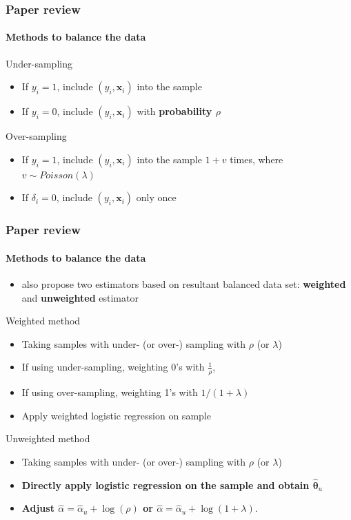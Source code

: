 \documentclass{beamer}
\newcommand{\red}{\color{red}}
\newcommand{\blue}{\color{blue}}
\newcommand{\htheta}{\hat{\bm{\theta}}}
\newcommand{\x}{\bm{x}}
\newcommand{\rhl}[1]{{\red \textbf{#1}}}
\newcommand{\bhl}[1]{{\blue \textbf{#1}}}
\begin{document}
    \begin{frame}
        \frametitle{Paper review}
        \framesubtitle{Methods to balance the data}
        \begin{exampleblock}{Under-sampling}
        \begin{itemize}
            \item If $y_i=1$, include $(y_i, \x_i)$ into the sample
            \item If $y_i=0$, include $(y_i, \x_i)$ with \bhl{probability $\rho$}
        \end{itemize}
    \end{exampleblock}
    \begin{exampleblock}{Over-sampling}
        \begin{itemize}
            \item If $y_i=1$, include $(y_i, \x_i)$ into the sample $1+v$ times, where \bhl{$v\sim Poisson(\lambda)$}
            \item If $\delta_i=0$, include $(y_i, \x_i)$ only once
        \end{itemize}
    \end{exampleblock}
    \end{frame}

    \begin{frame}
        \frametitle{Paper review}
        \framesubtitle{Methods to balance the data}
        \begin{itemize}
            \item \cite{wang2020logistic} also propose two estimators based on resultant balanced data set: \rhl{weighted} and \rhl{unweighted} estimator
        \end{itemize}
        \begin{exampleblock}{Weighted method}
        \begin{itemize}
            \item Taking samples with under- (or over-) sampling with $\rho$ (or $\lambda$)
            \item If using under-sampling, weighting 0's with $\frac{1}{\rho}$, 
            \item If using over-sampling, weighting 1's with $1/(1+\lambda)$
            \item Apply weighted logistic regression on sample
        \end{itemize}
    \end{exampleblock}
    \begin{exampleblock}{Unweighted method}
        \begin{itemize}
            \item Taking samples with under- (or over-) sampling with $\rho$ (or $\lambda$)
            \item \rhl{Directly apply logistic regression on the sample and obtain $\htheta_u$}
            \item \rhl{Adjust $\hat{\alpha}=\hat{\alpha}_u+\log(\rho)$ or $\hat{\alpha}=\hat{\alpha}_u+\log(1+\lambda)$}.
        \end{itemize}
    \end{exampleblock}
    \end{frame}
\end{document}
